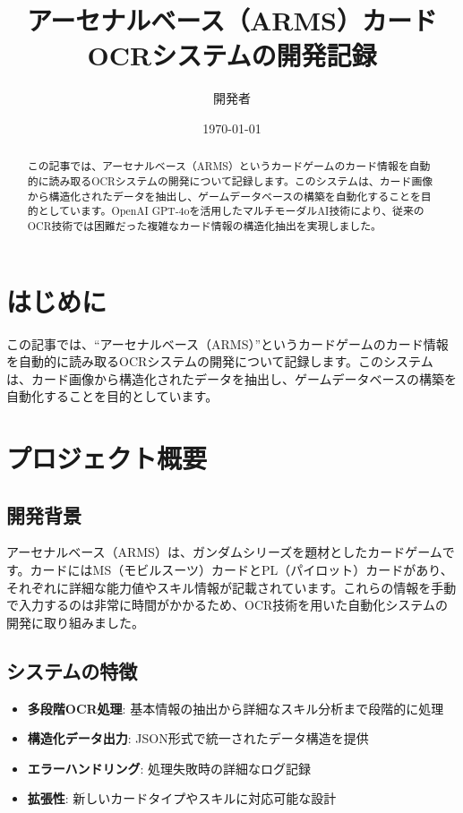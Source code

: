 \documentclass[a4paper,11pt]{jsarticle}
\title{アーセナルベース（ARMS）カードOCRシステムの開発記録}
\author{開発者}
\date{\today}
\begin{document}
\maketitle

\begin{abstract}
この記事では、アーセナルベース（ARMS）というカードゲームのカード情報を自動的に読み取るOCRシステムの開発について記録します。このシステムは、カード画像から構造化されたデータを抽出し、ゲームデータベースの構築を自動化することを目的としています。OpenAI GPT-4oを活用したマルチモーダルAI技術により、従来のOCR技術では困難だった複雑なカード情報の構造化抽出を実現しました。
\end{abstract}

\tableofcontents
\newpage

\section*{はじめに}

この記事では、``アーセナルベース（ARMS）''というカードゲームのカード情報を自動的に読み取るOCRシステムの開発について記録します。このシステムは、カード画像から構造化されたデータを抽出し、ゲームデータベースの構築を自動化することを目的としています。

\section*{プロジェクト概要}

\subsection*{開発背景}
アーセナルベース（ARMS）は、ガンダムシリーズを題材としたカードゲームです。カードにはMS（モビルスーツ）カードとPL（パイロット）カードがあり、それぞれに詳細な能力値やスキル情報が記載されています。これらの情報を手動で入力するのは非常に時間がかかるため、OCR技術を用いた自動化システムの開発に取り組みました。

\subsection*{システムの特徴}
\begin{itemize}
    \item \textbf{多段階OCR処理}: 基本情報の抽出から詳細なスキル分析まで段階的に処理
    \item \textbf{構造化データ出力}: JSON形式で統一されたデータ構造を提供
    \item \textbf{エラーハンドリング}: 処理失敗時の詳細なログ記録
    \item \textbf{拡張性}: 新しいカードタイプやスキルに対応可能な設計
\end{itemize}
\end{document}
